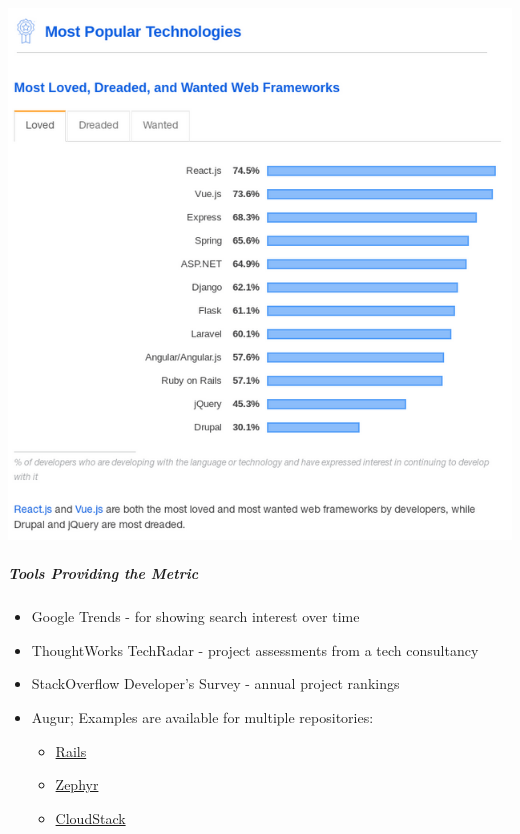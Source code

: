 \includegraphics{images/organizational-project-skill-demand_stack-overflow.png}

\hypertarget{tools-providing-the-metric}{%
\subparagraph{Tools Providing the
Metric}\label{tools-providing-the-metric}}

\begin{itemize}
\tightlist
\item
  Google Trends - for showing search interest over time
\item
  ThoughtWorks TechRadar - project assessments from a tech consultancy
\item
  StackOverflow Developer's Survey - annual project rankings
\item
  Augur; Examples are available for multiple repositories:

  \begin{itemize}
  \tightlist
  \item
    \href{http://augur.osshealth.io/repo/Rails\%20(wg-value)/rails/overview}{Rails}
  \item
    \href{http://augur.osshealth.io/repo/Zephyr-RTOS/zephyr/overview}{Zephyr}
  \item
    \href{http://augur.osshealth.io/repo/Apache\%20(wg-value)/cloudstack/overview}{CloudStack}
  \end{itemize}
\end{itemize}

